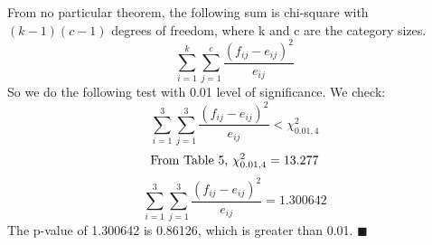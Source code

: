 \documentclass[12pt]{article}
\begin{document}
	\newline
	From no particular theorem, the following sum is chi-square with \((k-1)(c-1)\) degrees of freedom, where k and c are the category sizes.
	\[\sum_{i=1}^k\sum_{j=1}^c\frac{(f_{ij}-e_{ij})^2}{e_{ij}}\]
	So we do the following test with 0.01 level of significance. We check:
	\[\sum_{i=1}^3\sum_{j=1}^3\frac{(f_{ij}-e_{ij})^2}{e_{ij}} < \chi^2_{0.01, 4}\]
	\[\textup{From Table 5, } \chi^2_{0.01, 4} = 13.277\]
	\[\sum_{i=1}^3\sum_{j=1}^3\frac{(f_{ij}-e_{ij})^2}{e_{ij}} = 1.300642\]
	\newline
	The p-value of 1.300642 is 0.86126, which is greater than 0.01.
	\newline \(\blacksquare\)
\end{document}

